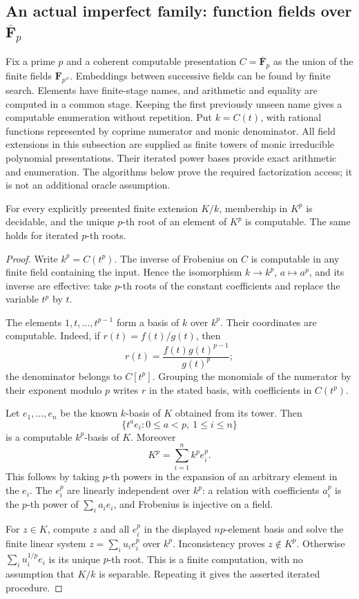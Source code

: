 \subsection{An actual imperfect family: function fields over
  \texorpdfstring{$\overline{\mathbf F}_p$}{the algebraic closure of a finite field}}
\label{C:function-fields-subsection}

Fix a prime $p$ and a coherent computable presentation
$C=\overline{\mathbf F}_p$ as the union of the finite fields
$\mathbf F_{p^{s!}}$. Embeddings between successive fields can
be found by finite search. Elements have finite-stage names,
and arithmetic and equality are computed in a common stage.
Keeping the first previously unseen name gives a computable
enumeration without repetition. Put $k=C(t)$, with rational
functions represented by coprime numerator and monic denominator.
All field extensions in this subsection are supplied as finite
towers of monic irreducible polynomial presentations. Their
iterated power bases provide exact arithmetic and enumeration.
The algorithms below prove the required factorization access;
it is not an additional oracle assumption.

\begin{lemma}
\label{C:function-field-pth-roots}
For every explicitly presented finite extension $K/k$, membership
in $K^p$ is decidable, and the unique $p$-th root of an element
of $K^p$ is computable. The same holds for iterated $p$-th roots.
\end{lemma}
\begin{proof}
Write $k^p=C(t^p)$. The inverse of Frobenius on $C$ is computable
in any finite field containing the input. Hence the isomorphism
$k\longrightarrow k^p$, $a\mapsto a^p$, and its inverse are
effective: take $p$-th roots of the constant coefficients and
replace the variable $t^p$ by $t$.

The elements $1,t,\ldots,t^{p-1}$ form a basis of $k$ over $k^p$.
Their coordinates are computable. Indeed, if $r(t)=f(t)/g(t)$,
then
\[
 r(t)=\frac{f(t)g(t)^{p-1}}{g(t)^p};
\]
the denominator belongs to $C[t^p]$. Grouping the monomials of
the numerator by their exponent modulo $p$ writes $r$ in the
stated basis, with coefficients in $C(t^p)$.

Let $e_1,\ldots,e_n$ be the known $k$-basis of $K$ obtained from
its tower. Then
\[
 \{t^a e_i:0\leq a<p,\ 1\leq i\leq n\}
\]
is a computable $k^p$-basis of $K$. Moreover
\[
             K^p=\sum_{i=1}^n k^p e_i^p.               \tag{C.3.K1}
\]
This follows by taking $p$-th powers in the expansion of an
arbitrary element in the $e_i$. The $e_i^p$ are linearly
independent over $k^p$: a relation with coefficients $a_i^p$
is the $p$-th power of $\sum_i a_i e_i$, and Frobenius is
injective on a field.

For $z\in K$, compute $z$ and all $e_i^p$ in the displayed
$np$-element basis and solve the finite linear system
$z=\sum_i u_i e_i^p$ over $k^p$. Inconsistency proves
$z\notin K^p$. Otherwise
$\sum_i u_i^{1/p}e_i$ is its unique $p$-th root.
This is a finite computation, with no assumption that $K/k$
is separable. Repeating it gives the asserted iterated procedure.
\end{proof}

